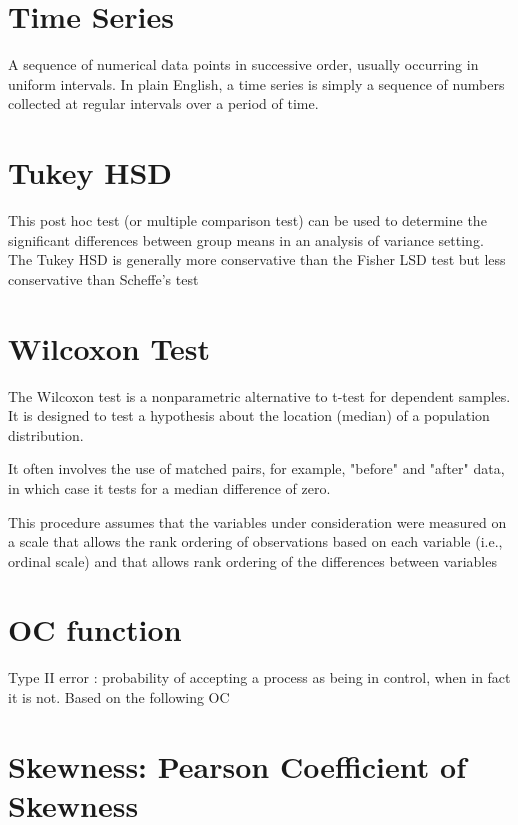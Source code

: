 \section{Time Series}

A sequence of numerical data points in successive order, usually occurring in uniform intervals. In plain English, a time series is simply a sequence of numbers collected at regular intervals over a period of time.





\section{Tukey HSD}

This post hoc test (or multiple comparison test) can be used to determine the significant differences between group means in an analysis of variance setting. The Tukey HSD is generally more conservative than the Fisher LSD test but less conservative than Scheffe's test
\section{Wilcoxon Test}

The Wilcoxon test is a nonparametric alternative to t-test for dependent samples. It is designed to test a hypothesis about the location (median) of a population distribution. 

It often involves the use of matched pairs, for example, "before" and "after" data, in which case it tests for a median difference of zero.

This procedure assumes that the variables under consideration were measured on a scale that allows the rank ordering of observations based on each variable (i.e., ordinal scale) and that allows rank ordering of the differences between variables





\section{OC function}
Type II error : probability of accepting a process as being in control, when in fact it is not.
Based on the following OC



\section{Skewness: Pearson Coefficient of Skewness}

